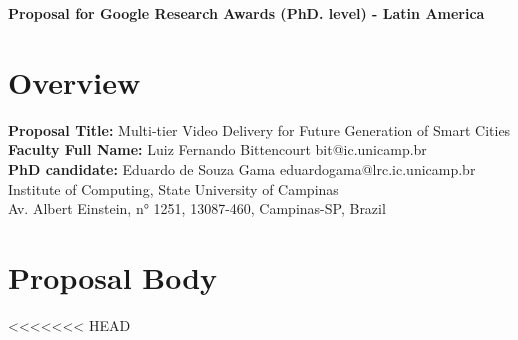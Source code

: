 \documentclass[a4paper, 11pt]{article}
\begin{document}
	\begin{center}
		{\bf Proposal for Google Research Awards (PhD. level) - Latin America}
	\end{center}

	\section{Overview}

	\noindent
	{\bf Proposal Title:} Multi-tier Video Delivery for Future Generation of Smart Cities \\
	{\bf Faculty Full Name:} Luiz Fernando Bittencourt \hfill bit@ic.unicamp.br \\
	{\bf PhD candidate:} Eduardo de Souza Gama \hfill eduardogama@lrc.ic.unicamp.br \\
	Institute of Computing, State University of Campinas \\
	Av. Albert Einstein, n° 1251, 13087-460, Campinas-SP, Brazil \\


	\section{Proposal Body}	
	
	
	
    

    
    
    
<<<<<<< HEAD
\end{document}
